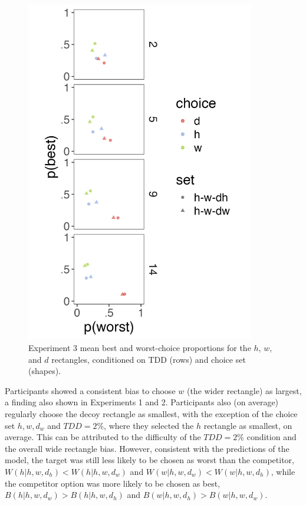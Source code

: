 \begin{figure}
   \includegraphics[width=100mm]{figures/crit_mean_choice_by_set_dist_labelHW.jpeg}
   \caption{Experiment 3 mean best and worst-choice proportions for the $h$, $w$, and $d$ rectangles, conditioned on TDD (rows) and choice set (shapes).}
   \label{fig:bw_mean_choice_by_set}
\end{figure}

Participants showed a consistent bias to choose $w$ (the wider rectangle) as largest, a finding also shown in Experiments 1 and 2. Participants also (on average) regularly choose the decoy rectangle as smallest, with the exception of the choice set $h,w,d_{w}$ and $TDD=2\%$, where they selected the $h$ rectangle as smallest, on average. This can be attributed to the difficulty of the $TDD=2\%$ condition and the overall wide rectangle bias. However, consistent with the predictions of the model, the target was still less likely to be chosen as worst than the competitor, $W(h|{h,w,d_{h}})<W(h|{h,w,d_{w}})$ and $W(w|{h,w,d_{w}})<W(w|{h,w,d_{h}})$, while the competitor option was more likely to be chosen as best, $B(h|{h,w,d_{w}})>B(h|{h,w,d_{h}})$ and $B(w|{h,w,d_{h}})>B(w|{h,w,d_{w}})$. 

